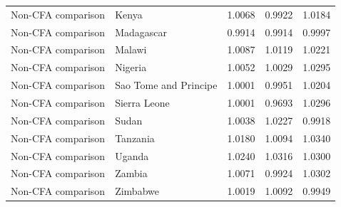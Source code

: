 \begin{table}
\begin{tabular}[t]{llrrr}
Non-CFA comparison & Kenya & 1.0068 & 0.9922 & 1.0184\\
\addlinespace
Non-CFA comparison & Madagascar & 0.9914 & 0.9914 & 0.9997\\
Non-CFA comparison & Malawi & 1.0087 & 1.0119 & 1.0221\\
Non-CFA comparison & Nigeria & 1.0052 & 1.0029 & 1.0295\\
Non-CFA comparison & Sao Tome and Principe & 1.0001 & 0.9951 & 1.0204\\
Non-CFA comparison & Sierra Leone & 1.0001 & 0.9693 & 1.0296\\
\addlinespace
Non-CFA comparison & Sudan & 1.0038 & 1.0227 & 0.9918\\
Non-CFA comparison & Tanzania & 1.0180 & 1.0094 & 1.0340\\
Non-CFA comparison & Uganda & 1.0240 & 1.0316 & 1.0300\\
Non-CFA comparison & Zambia & 1.0071 & 0.9924 & 1.0302\\
Non-CFA comparison & Zimbabwe & 1.0019 & 1.0092 & 0.9949\\
\bottomrule
\end{tabular}
\end{table}
